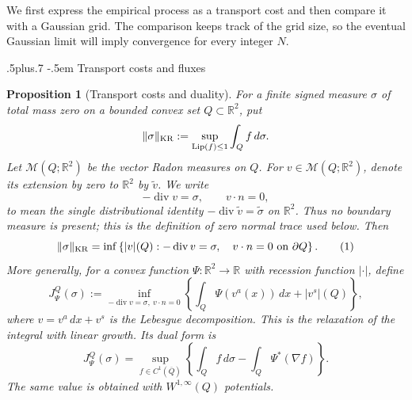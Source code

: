 \documentclass[11pt,reqno]{amsart}
\makeatletter
\def\subsection{\@startsection{subsection}{2}{0pt}%
  {.5\linespacing plus.7\linespacing}
  {-.5em}
  {\normalfont\scshape}}
\theoremstyle{plain}
\newtheorem{proposition}[theorem]{Proposition}
\theoremstyle{definition}
\theoremstyle{remark}
\numberwithin{equation}{section}
\newcommand{\1}{\mathbf 1}
\makeatother
\begin{document}
We first express the empirical process as a transport cost and then compare
it with a Gaussian grid.  The comparison keeps track of the grid size, so
the eventual Gaussian limit will imply convergence for every integer $N$.

\subsection{Transport costs and fluxes}

\begin{proposition}[Transport costs and duality]\label{def:kr-beckmann}
For a finite signed measure $\sigma$ of total mass zero on a bounded convex
set $Q\subset\mathbb R^2$, put
\begin{equation*}
\|\sigma\|_ {\rm KR}
:=\sup_ {\operatorname {Lip}(f)\leq1}\int_ Q f\,d\sigma .
\end{equation*}
Let $\mathcal M(Q;\mathbb R^2)$ be the vector Radon measures on
$Q$.  For $v\in\mathcal M(Q;\mathbb R^2)$, denote its extension by
zero to $\mathbb R^2$ by $\widetilde v$.  We write
\begin{equation*}
-\operatorname {div}v=\sigma,\qquad v\cdot n=0,
\end{equation*}
to mean the single distributional identity
$-\operatorname {div}\widetilde v=\widetilde\sigma$ on
$\mathbb R^2$.  Thus no boundary measure is present; this is the
definition of zero normal trace used below.  Then
\begin{equation}
\|\sigma\|_ {\rm KR}
=\inf\left\{|v|(Q):
-\operatorname {div}v=\sigma,\quad v\cdot n=0\text{ on }\partial Q
\right\}.
\tag{1}
\end{equation}
More generally, for a convex function $\Psi:\mathbb R^2\to\mathbb R$
with recession function $|\cdot|$, define
\begin{equation*}
J^Q_ \Psi(\sigma)
:=\inf_ {-\operatorname {div}v=\sigma,\ v\cdot n=0}
\left\{\int_ Q\Psi(v^a(x))\,dx+|v^s|(Q)\right\},
\end{equation*}
where $v=v^a\,dx+v^s$ is the Lebesgue decomposition.  This is the
relaxation of the integral with linear growth.
Its dual form is
\begin{equation}
J^Q_ \Psi(\sigma)
=\sup_ {f\in C^1(\overline Q)}
\left\{\int_ Q f\,d\sigma-\int_ Q\Psi^*(\nabla f)\right\}.
\tag{2}
\end{equation}
The same value is obtained with $W^{1,\infty}(Q)$ potentials.

\end{proposition}
\end{document}
